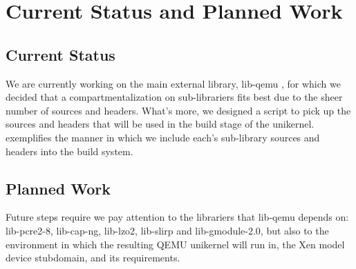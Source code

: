\chapter{Current Status and Planned Work}
\label{chapter:status-planned-work}

\section{Current Status}
\label{sec:current-status}

We are currently working on the main external library, lib-qemu \cite{lib-qemu}, for which we decided that a compartmentalization on sub-librariers fits best due to the sheer number of sources and headers.
What's more, we designed a script to pick up the sources and headers that will be used in the build stage of the unikernel.
 exemplifies the manner in which we include each's sub-library sources and headers into the build system.

\section{Planned Work}
\label{sec:planned work}

Future steps require we pay attention to the librariers that lib-qemu depends on: lib-pcre2-8, lib-cap-ng, lib-lzo2, lib-slirp and lib-gmodule-2.0, but also to the environment in which the resulting QEMU unikernel will run in, the Xen model device stubdomain, and its requirements.
